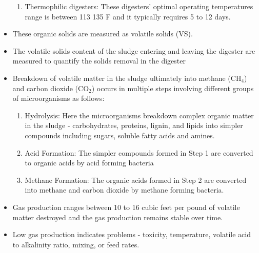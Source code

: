 \begin{itemize}
\begin{enumerate}[1. ]
			\item Thermophilic digesters:  These digesters’ optimal operating temperatures range is between 113   135 F and it typically requires 5 to 12 days.\\
			\end{enumerate}     
		\item These organic solids are measured as volatile solids (VS).  
		\item The volatile solids content of the sludge entering and leaving the digester are measured to quantify the solids removal in the digester
		 \item Breakdown of volatile matter in the sludge ultimately into methane (CH$_4$) and carbon dioxide (CO$_2$) occurs in multiple steps involving different groups of microorganisms as follows:\\
			\begin{enumerate}[Step 1.]
			\item Hydrolysis:  Here the microorganisms breakdown complex organic matter in the sludge - carbohydrates, proteins, lignin, and lipids into simpler compounds including sugars, soluble fatty acids and amines.\\
			\item Acid Formation:  The simpler compounds formed in Step 1 are converted to organic acids by acid forming bacteria\\
			\item Methane Formation: The organic acids formed in Step 2 are converted into methane and carbon dioxide by methane forming bacteria.\\
			\end{enumerate}
		\item Gas production ranges between 10 to 16 cubic feet per pound of volatile matter destroyed and the gas production remains stable over time.
		\item Low gas production indicates problems - toxicity, temperature, volatile acid to alkalinity ratio, mixing, or feed rates.
		\end{itemize}


